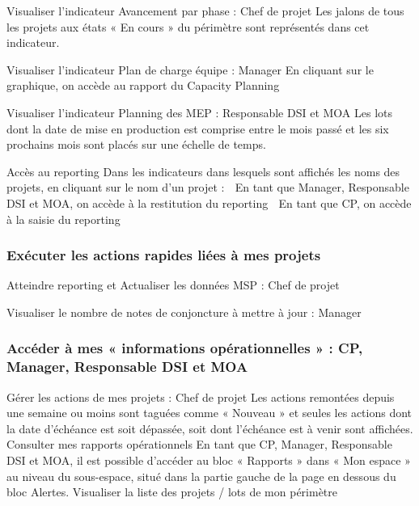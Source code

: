 Visualiser l’indicateur Avancement par phase : Chef de projet
    Les jalons de tous les projets aux états « En cours » du périmètre sont représentés dans cet indicateur.

Visualiser l’indicateur Plan de charge équipe : Manager
En cliquant sur le graphique, on accède au rapport du Capacity Planning

Visualiser l’indicateur Planning des MEP : Responsable DSI et MOA
Les lots dont la date de mise en production est comprise entre le mois passé et les six prochains mois sont placés sur une échelle de temps.

Accès au reporting
Dans les indicateurs dans lesquels sont affichés les noms des projets, en cliquant sur le nom d’un projet :
	En tant que Manager, Responsable DSI et MOA, on accède à la restitution du reporting
	En tant que CP, on accède à la saisie du reporting

\subsubsection{Exécuter les actions rapides liées à mes projets}

Atteindre reporting et Actualiser les données MSP : Chef de projet

Visualiser le nombre de notes de conjoncture à mettre à jour : Manager


\subsubsection{Accéder à mes « informations opérationnelles » : CP, Manager, Responsable DSI et MOA}
Gérer les actions de mes projets : Chef de projet
Les actions remontées depuis une semaine ou moins sont taguées comme « Nouveau » et seules les actions dont la date d’échéance est soit dépassée, soit dont l’échéance est à venir sont affichées.
Consulter mes rapports opérationnels
En tant que CP, Manager, Responsable DSI et MOA, il est possible d’accéder au bloc « Rapports » dans « Mon espace » au niveau du sous-espace, situé dans la partie gauche de la page en dessous du bloc Alertes.
Visualiser la liste des projets / lots de mon périmètre


